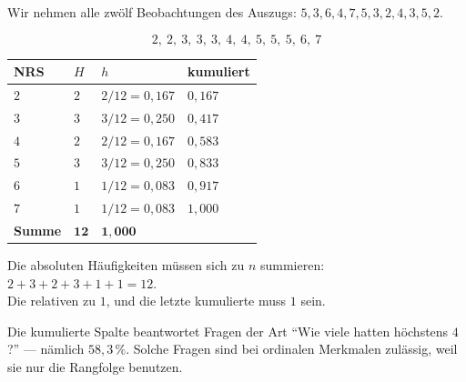 \begin{merksatz}
Wir nehmen alle zwölf Beobachtungen des Auszugs: $5,3,6,4,7,5,3,2,4,3,5,2$.

\[ 2,\ 2,\ 3,\ 3,\ 3,\ 4,\ 4,\ 5,\ 5,\ 5,\ 6,\ 7 \]

\begin{center}
{\small
\renewcommand{\arraystretch}{1.38}
\begin{tabular}{@{}P{1.3cm}P{1.5cm}P{1.9cm}P{2.4cm}@{}}
\toprule
\textbf{NRS} & $H$ & $h$ & \textbf{kumuliert}\\
\midrule
$2$ & $2$ & $2/12 = 0{,}167$ & $0{,}167$\\
$3$ & $3$ & $3/12 = 0{,}250$ & $0{,}417$\\
$4$ & $2$ & $2/12 = 0{,}167$ & $0{,}583$\\
$5$ & $3$ & $3/12 = 0{,}250$ & $0{,}833$\\
$6$ & $1$ & $1/12 = 0{,}083$ & $0{,}917$\\
$7$ & $1$ & $1/12 = 0{,}083$ & $1{,}000$\\
\midrule
\textbf{Summe} & $\mathbf{12}$ & $\mathbf{1{,}000}$ & \\
\bottomrule
\end{tabular}}
\end{center}

Die absoluten Häufigkeiten müssen sich zu $n$ summieren: $2+3+2+3+1+1 = 12$. \checkmark\\
Die relativen zu $1$, und die letzte kumulierte muss $1$ sein. \checkmark

Die kumulierte Spalte beantwortet Fragen der Art \enquote{Wie viele hatten höchstens $4$?} --- nämlich $58{,}3\,\%$. Solche Fragen sind bei ordinalen Merkmalen zulässig, weil sie nur die Rangfolge benutzen.
\end{merksatz}

